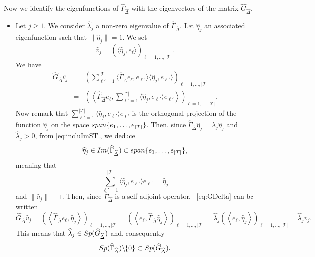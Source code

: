 \documentclass[aos]{imsart}
\theoremstyle{plain}
\theoremstyle{remark}
\newcommand{\1}{1}
\begin{document}
Now we identify the eigenfunctions of $\widehat\Gamma_{\widehat\Delta}$ with the eigenvectors of the matrix $\widehat G_{\widehat\Delta}$. 
\begin{itemize}
\item Let $j\geq 1$. We consider $\widehat\lambda_j$ a non-zero eigenvalue of  $\widehat \Gamma_{\widehat\Delta}$. Let $\widehat\eta_j$ an associated eigenfunction such that $\|\widehat\eta_j\|=1$. We set
\[
\widehat v_j = \left(\langle \widehat\eta_j,e_\ell\rangle\right)_{\ell=1,\hdots,|\mathcal T|}. 
\]
We have 
\begin{eqnarray}
\widehat G_{\widehat\Delta}\widehat v_j &=&\left( \sum_{\ell'=1}^{|\mathcal T|}\langle\widehat\Gamma_{\widehat\Delta}e_{\ell},e_{\ell'}\rangle\langle \widehat\eta_j,e_{\ell'}\rangle\right)_{\ell=1,\hdots,|\mathcal T|}%
\nonumber\\
&=&\left(\left\langle \widehat\Gamma_{\widehat\Delta}e_\ell,\sum_{\ell'=1}^{|\mathcal T|}\langle \widehat\eta_j,e_{\ell'}\rangle e_{\ell'}\right\rangle\right)_{\ell=1,\hdots,|\mathcal T|}.\label{eq:GDelta} \end{eqnarray}
Now remark that $\sum_{\ell'=1}^{|\mathcal T|}\langle \widehat\eta_j,e_{\ell'}\rangle e_{\ell'}$ is the orthogonal projection of the function $\widehat\eta_{j}$ on the space ${\rm span}\{e_1,\hdots,e_{|\mathcal T|}\}$. Then, since $\widehat\Gamma_{\widehat\Delta}\widehat\eta_j=\widehat\lambda_j\widehat\eta_j$  and $\widehat\lambda_j>0$, from \eqref{eq:incluImST}, we deduce  
\[
\widehat\eta_j\in{\rm Im}(\widehat\Gamma_{\widehat\Delta})\subset{\rm span}\{e_1,\hdots,e_{|\mathcal T|}\}, 
\]
meaning that 
\[
\sum_{\ell'=1}^{|\mathcal T|}\langle \widehat\eta_j,e_{\ell'}\rangle e_{\ell'} = \widehat\eta_j
\]
and $\|\widehat v_j \|=1$.
Then, since $\widehat\Gamma_{\widehat\Delta}$ is a self-adjoint operator, ~\eqref{eq:GDelta} can be written
\[
\widehat G_{\widehat\Delta}\widehat v_j = \left(\left\langle \widehat\Gamma_{\widehat\Delta}e_\ell,\widehat\eta_j\right\rangle\right)_{\ell=1,\hdots,|\mathcal T|}=\left(\left\langle e_\ell,\widehat\Gamma_{\widehat\Delta}\widehat\eta_j\right\rangle\right)_{\ell=1,\hdots,|\mathcal T|} = \widehat\lambda_j\left(\left\langle e_\ell,\widehat\eta_j\right\rangle\right)_{\ell=1,\hdots,|\mathcal T|}=\widehat\lambda_j \widehat v_j .
\]
This means that $\widehat\lambda_j\in {\rm Sp}(\widehat G_{\widehat\Delta})$ and, consequently 
\[
{\rm Sp}(\widehat\Gamma_{\widehat\Delta})\backslash\{0\}\subset {\rm Sp}(\widehat G_{\widehat\Delta}). 
\]
\end{itemize}
\end{document}
